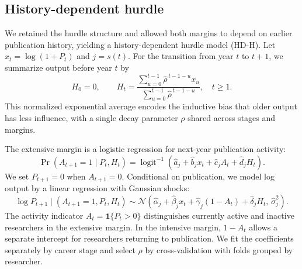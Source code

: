 \documentclass{article}
\begin{document}
\subsection*{History-dependent hurdle}\label{subsec:model_HD-H}

We retained the hurdle structure and allowed both margins to depend
on earlier publication history, yielding a history-dependent hurdle
model (HD-H). Let $x_t=\log(1+P_t)$ and $j=s(t)$. For the transition
from year $t$ to $t+1$, we summarize output before year $t$ by
\begin{equation}
H_0=0,\qquad
H_t=
\frac{\sum_{u=0}^{t-1}\hat\rho^{\,t-1-u}x_u}
     {\sum_{u=0}^{t-1}\hat\rho^{\,t-1-u}},
\quad t\geq 1.
\label{eq:hdh-history}
\end{equation}
This normalized exponential average encodes the inductive bias that
older output has less influence, with a single decay parameter
$\rho$ shared across stages and margins.

The extensive margin is a logistic regression for next-year
publication activity:
\begin{equation}
\Pr(A_{t+1}=1\mid P_t,H_t)=
\operatorname{logit}^{-1}\!\left(
\hat a_j+\hat b_j x_t+\hat c_j A_t+\hat d_j H_t
\right).
\label{eq:hdh-activity}
\end{equation}
We set $P_{t+1}=0$ when $A_{t+1}=0$. Conditional on publication,
we model log output by a linear regression with Gaussian shocks:
\begin{equation}
\log P_{t+1}\mid(A_{t+1}=1,P_t,H_t)
\sim
\mathcal{N}\!\left(
\hat\alpha_j+\hat\beta_j x_t+\hat\gamma_j(1-A_t)
+\hat\delta_j H_t,\,
\hat\sigma_j^2
\right).
\label{eq:hdh-output}
\end{equation}
The activity indicator $A_t=\mathbf{1}\{P_t>0\}$ distinguishes
currently active and inactive researchers in the extensive margin.
In the intensive margin, $1-A_t$ allows a separate intercept for
researchers returning to publication. We fit the coefficients
separately by career stage and select $\rho$ by cross-validation
with folds grouped by researcher.
\end{document}

